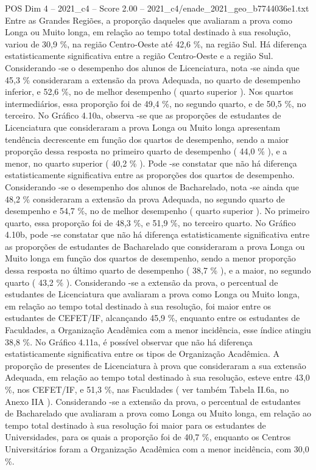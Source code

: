 \begin{textsample}{POS Dim 4 – 2021\_c4 – Score 2.00 – 2021\_c4/enade\_2021\_geo\_b7744036e1.txt}
Entre as Grandes Regiões, a proporção daqueles que avaliaram a prova como Longa ou Muito longa, em relação ao tempo total destinado à sua resolução, variou de 30,9 \%, na região Centro-Oeste até 42,6 \%, na região Sul.
Há diferença estatisticamente significativa entre a região Centro-Oeste e a região Sul.
Considerando -se o desempenho dos alunos de Licenciatura, nota -se ainda que 45,3 \% consideraram a extensão da prova Adequada, no quarto de desempenho inferior, e 52,6 \%, no de melhor desempenho ( quarto superior ).
Nos quartos intermediários, essa proporção foi de 49,4 \%, no segundo quarto, e de 50,5 \%, no terceiro.
No Gráfico 4.10a, observa -se que as proporções de estudantes de Licenciatura que consideraram a prova Longa ou Muito longa apresentam tendência decrescente em função dos quartos de desempenho, sendo a maior proporção dessa resposta no primeiro quarto de desempenho ( 44,0 \% ), e a menor, no quarto superior ( 40,2 \% ).
Pode -se constatar que não há diferença estatisticamente significativa entre as proporções dos quartos de desempenho.
Considerando -se o desempenho dos alunos de Bacharelado, nota -se ainda que 48,2 \% consideraram a extensão da prova Adequada, no segundo quarto de desempenho e 54,7 \%, no de melhor desempenho ( quarto superior ).
No primeiro quarto, essa proporção foi de 48,3 \%, e 51,9 \%, no terceiro quarto.
No Gráfico 4.10b, pode -se constatar que não há diferença estatisticamente significativa entre as proporções de estudantes de Bacharelado que consideraram a prova Longa ou Muito longa em função dos quartos de desempenho, sendo a menor proporção dessa resposta no último quarto de desempenho ( 38,7 \% ), e a maior, no segundo quarto ( 43,2 \% ).
Considerando -se a extensão da prova, o percentual de estudantes de Licenciatura que avaliaram a prova como Longa ou Muito longa, em relação ao tempo total destinado à sua resolução, foi maior entre os estudantes de CEFET/IF, alcançando 45,9 \%, enquanto entre os estudantes de Faculdades, a Organização Acadêmica com a menor incidência, esse índice atingiu 38,8 \%.
No Gráfico 4.11a, é possível observar que não há diferença estatisticamente significativa entre os tipos de Organização Acadêmica.
A proporção de presentes de Licenciatura à prova que consideraram a sua extensão Adequada, em relação ao tempo total destinado à sua resolução, esteve entre 43,0 \%, nos CEFET/IF, e 51,3 \%, nas Faculdades ( ver também Tabela II.6a, no Anexo IIA ).
Considerando -se a extensão da prova, o percentual de estudantes de Bacharelado que avaliaram a prova como Longa ou Muito longa, em relação ao tempo total destinado à sua resolução foi maior para os estudantes de Universidades, para os quais a proporção foi de 40,7 \%, enquanto os Centros Universitários foram a Organização Acadêmica com a menor incidência, com 30,0 \%.

\end{textsample}
